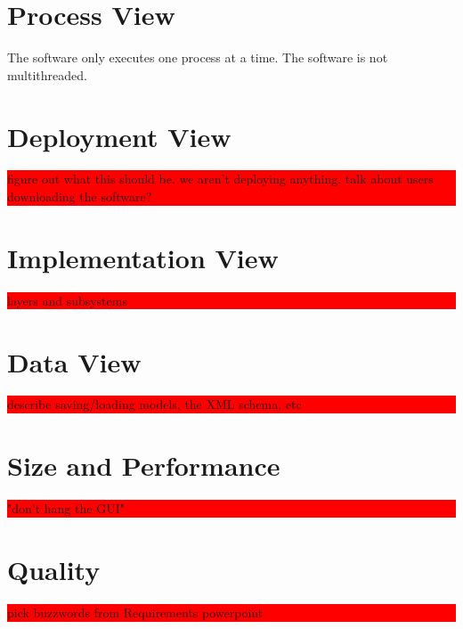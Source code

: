 \documentclass{article}
\newcommand{\todo}[1]{\colorbox{red}{\begin{minipage}{\textwidth}{#1}\end{minipage}}}
\begin{document}
\section{Process View}
The software only executes one process at a time. The software is not multithreaded.

\section{Deployment View}
\todo{figure out what this should be. we aren't deploying anything. talk about users downloading the software?}

\section{Implementation View}
\todo{layers and subsystems}

\section{Data View}
\todo{describe saving/loading models, the XML schema, etc}

\section{Size and Performance}
\todo{"don't hang the GUI"}

\section{Quality}
\todo{pick buzzwords from Requirements powerpoint}
\end{document}

